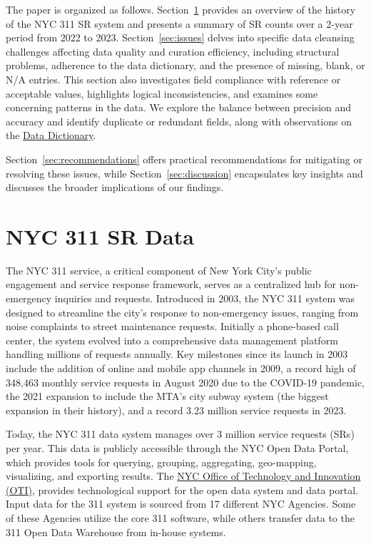 \documentclass[linenumber]{jdsart}
\begin{document}
The paper is organized as follows. Section~\ref{sec:data} provides 
an overview of the history of the NYC 311 SR system and presents 
a summary of SR counts over a 2\mbox{-}year period from 2022 to 2023. 
Section~\ref{sec:issues} delves into specific data cleansing 
challenges affecting data quality and curation efficiency, 
including structural problems, adherence to the data dictionary, 
and the presence of missing, blank, or N/A entries. This section
 also investigates field compliance with reference or acceptable values, 
highlights logical inconsistencies, and examines some concerning patterns 
in the data. We explore the balance between precision and accuracy 
and identify duplicate or redundant fields, along with observations 
on the \href{https://data.cityofnewyork.us/api/views/erm2-nwe9/files/b372b884-f86a-453b-ba16-1fe06ce9d212?download=true&filename=311_ServiceRequest_2010-Present_DataDictionary_Updated_2023.xlsx}{Data Dictionary}.

Section~\ref{sec:recommendations} offers 
practical recommendations for mitigating or resolving these issues, 
while Section~\ref{sec:discussion} encapsulates key insights and 
discusses the broader implications of our findings.


\section{NYC 311 SR Data} 
\label{sec:data}
The NYC 311 service, a critical component of New York City's public
engagement and service response framework, serves as a centralized hub
for non\mbox{-}emergency inquiries and requests. Introduced in 2003, the NYC
311 system was designed to streamline the city's response to
non\mbox{-}emergency issues, ranging from noise complaints to street
maintenance requests. Initially a phone\mbox{-}based call center, the system
evolved into a comprehensive data management platform handling
millions of requests annually. Key milestones since its launch in 2003
include the addition of online and mobile app channels in 2009, a
record high of 348,463 monthly service requests in August 2020 due to
the COVID\mbox{-}19 pandemic, the 2021 expansion to include the MTA's city
subway system (the biggest expansion in their history), and a 
record 3.23 million service requests in 2023. 

Today, the NYC 311 data system manages over 3 million service
requests (SRs) per year. This data is publicly accessible through the NYC Open Data
Portal, which provides tools for querying, grouping, aggregating,
geo\mbox{-}mapping, visualizing, and exporting results. The
\href{https://www.nyc.gov/content/oti/pages/}{NYC Office of Technology
  and Innovation (OTI)}, provides technological support for the
open data system and data portal. Input data for the 311 system 
is sourced from 17 different NYC Agencies. Some of these Agencies
utilize the core 311 software, while others transfer data to the
311 Open Data Warehouse from in\mbox{-}house systems.
\end{document}
